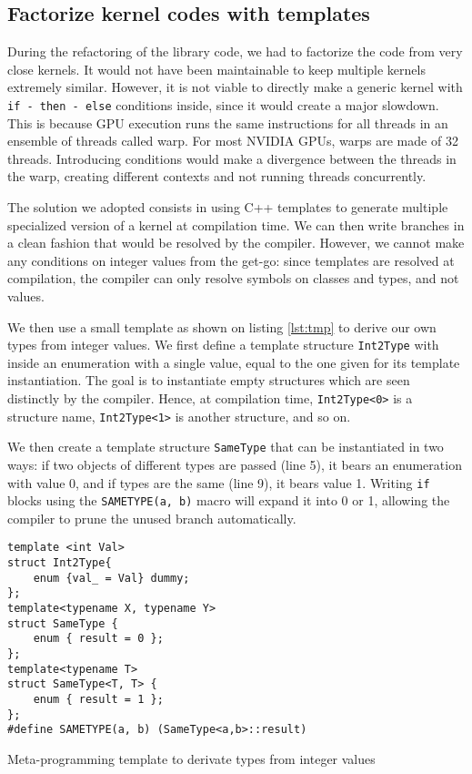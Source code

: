 
\subsection{Factorize kernel codes with templates}

During the refactoring of the library code, we had to factorize the code from very close kernels. It would not have been maintainable to keep multiple kernels extremely similar. However, it is not viable to directly make a generic kernel with \verb|if - then - else| conditions inside, since it would create a major slowdown. This is because GPU execution runs the same instructions for all threads in an ensemble of threads called warp. For most NVIDIA GPUs, warps are made of 32 threads. Introducing conditions would make a divergence between the threads in the warp, creating different contexts and not running threads concurrently.

The solution we adopted consists in using C++ templates to generate multiple specialized version of a kernel at compilation time. We can then write branches in a clean fashion that would be resolved by the compiler. However, we cannot make any conditions on integer values from the get-go: since templates are resolved at compilation, the compiler can only resolve symbols on classes and types, and not values. 

We then use a small template as shown on listing \ref{lst:tmp} to derive our own types from integer values. We first define a template structure \verb|Int2Type| with inside an enumeration with a single value, equal to the one given for its template instantiation. The goal is to instantiate empty structures which are seen distinctly by the compiler. Hence, at compilation time, \verb|Int2Type<0>| is a structure name, \verb|Int2Type<1>| is another structure, and so on.

We then create a template structure \verb|SameType| that can be instantiated in two ways: if two objects of different types are passed (line 5), it bears an enumeration with value 0, and if types are the same (line 9), it bears value 1. Writing \verb|if| blocks using the \verb|SAMETYPE(a, b)| macro will expand it into 0 or 1, allowing the compiler to prune the unused branch automatically.

\begin{listing}[h!]
	\begin{verbatim}
template <int Val>
struct Int2Type{
	enum {val_ = Val} dummy;
};
template<typename X, typename Y>
struct SameType {
	enum { result = 0 };
};
template<typename T>
struct SameType<T, T> {
	enum { result = 1 };
};
#define SAMETYPE(a, b) (SameType<a,b>::result)
	\end{verbatim}

	
	\caption{Meta-programming template to derivate types from integer values}
	\label{lst:tmp}
\end{listing}
	

